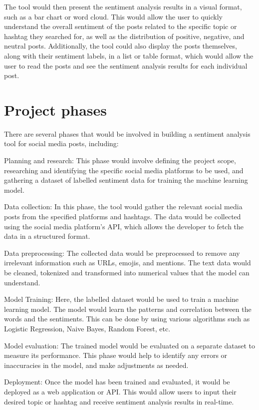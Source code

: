 \documentclass[a4paper,12pt]{article}
\begin{document}
The tool would then present the sentiment analysis results in a visual format, such as a bar chart or word cloud. This would allow the user to quickly understand the overall sentiment of the posts related to the specific topic or hashtag they searched for, as well as the distribution of positive, negative, and neutral posts. Additionally, the tool could also display the posts themselves, along with their sentiment labels, in a list or table format, which would allow the user to read the posts and see the sentiment analysis results for each individual post.
 

\tableofcontents

\section{Project phases}

There are several phases that would be involved in building a sentiment analysis tool for social media posts, including:

Planning and research: This phase would involve defining the project scope, researching and identifying the specific social media platforms to be used, and gathering a dataset of labelled sentiment data for training the machine learning model.

Data collection: In this phase, the tool would gather the relevant social media posts from the specified platforms and hashtags. The data would be collected using the social media platform's API, which allows the developer to fetch the data in a structured format.

Data preprocessing: The collected data would be preprocessed to remove any irrelevant information such as URLs, emojis, and mentions. The text data would be cleaned, tokenized and transformed into numerical values that the model can understand.

Model Training: Here, the labelled dataset would be used to train a machine learning model. The model would learn the patterns and correlation between the words and the sentiments. This can be done by using various algorithms such as Logistic Regression, Naive Bayes, Random Forest, etc.

Model evaluation: The trained model would be evaluated on a separate dataset to measure its performance. This phase would help to identify any errors or inaccuracies in the model, and make adjustments as needed.

Deployment: Once the model has been trained and evaluated, it would be deployed as a web application or API. This would allow users to input their desired topic or hashtag and receive sentiment analysis results in real-time.
\end{document}
